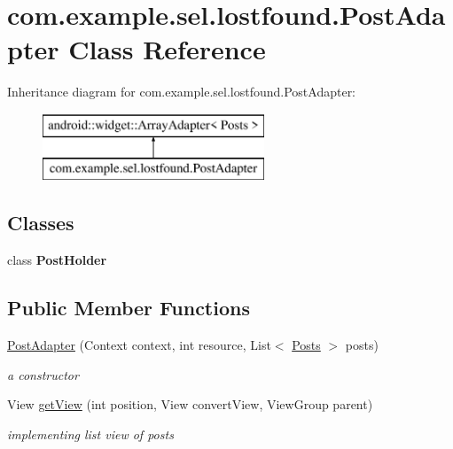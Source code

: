 \hypertarget{classcom_1_1example_1_1sel_1_1lostfound_1_1PostAdapter}{\section{com.\-example.\-sel.\-lostfound.\-Post\-Adapter Class Reference}
\label{classcom_1_1example_1_1sel_1_1lostfound_1_1PostAdapter}
}
Inheritance diagram for com.\-example.\-sel.\-lostfound.\-Post\-Adapter\-:\begin{figure}[H]
\begin{center}
\leavevmode
\includegraphics[height=2.000000cm]{classcom_1_1example_1_1sel_1_1lostfound_1_1PostAdapter}
\end{center}
\end{figure}
\subsection*{Classes}
\begin{DoxyCompactItemize}
\item 
class {\bfseries Post\-Holder}
\end{DoxyCompactItemize}
\subsection*{Public Member Functions}
\begin{DoxyCompactItemize}
\item 
\hypertarget{classcom_1_1example_1_1sel_1_1lostfound_1_1PostAdapter_a58de5e8d3132dd70bfd35dcb44bf80e1}{\hyperlink{classcom_1_1example_1_1sel_1_1lostfound_1_1PostAdapter_a58de5e8d3132dd70bfd35dcb44bf80e1}{Post\-Adapter} (Context context, int resource, List$<$ \hyperlink{classcom_1_1example_1_1sel_1_1lostfound_1_1Posts}{Posts} $>$ posts)}\label{classcom_1_1example_1_1sel_1_1lostfound_1_1PostAdapter_a58de5e8d3132dd70bfd35dcb44bf80e1}

\begin{DoxyCompactList}\small\item\em a constructor \end{DoxyCompactList}\item 
View \hyperlink{classcom_1_1example_1_1sel_1_1lostfound_1_1PostAdapter_aa2f3c1364857d97091ba325de3df6226}{get\-View} (int position, View convert\-View, View\-Group parent)
\begin{DoxyCompactList}\small\item\em implementing list view of posts \end{DoxyCompactList}\end{DoxyCompactItemize}


